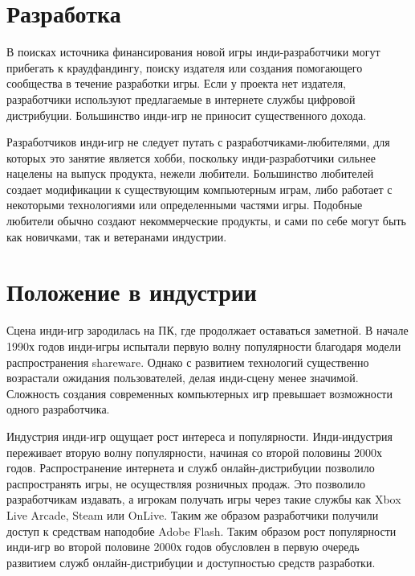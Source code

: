 \section{Разработка}
В поисках источника финансирования новой игры инди-разработчики могут прибегать к краудфандингу, поиску
издателя\cite{2.12,2.22,2.23} или создания помогающего сообщества в течение разработки игры\cite{2.24}. 
Если у проекта нет издателя, разработчики используют предлагаемые в интернете службы цифровой 
дистрибуции. Большинство инди-игр не приносит существенного дохода\cite{2.26}.

Разработчиков инди-игр не следует путать с разработчиками-любителями, для которых это занятие является
хобби, поскольку инди-разработчики сильнее нацелены на выпуск продукта, нежели любители. 
Большинство любителей создает модификации к существующим компьютерным играм, либо работает с 
некоторыми технологиями или определенными частями игры. Подобные любители обычно создают 
некоммерческие продукты, и сами по себе могут быть как новичками, так и ветеранами индустрии.

\section{Положение в индустрии}
Сцена инди-игр зародилась на ПК\cite{2.5}, где продолжает оставаться заметной\cite{2.19}. В начале 1990х 
годов инди-игры испытали первую волну популярности благодаря модели распространения shareware\cite{2.19}. 
Однако с развитием технологий существенно возрастали ожидания пользователей, делая инди-сцену менее 
значимой\cite{2.19}. Сложность создания современных компьютерных игр превышает возможности одного 
разработчика.

Индустрия инди-игр ощущает рост интереса и популярности\cite{2.20}. Инди-индустрия переживает вторую 
волну популярности, начиная со второй половины 2000х годов\cite{2.20}. Распространение интернета и служб
онлайн-дистрибуции позволило распространять игры, не осуществляя розничных продаж. Это позволило
разработчикам издавать\cite{2.5,2.17,2.19,2.20}, а игрокам получать игры через такие службы как
Xbox Live Arcade\cite{2.5}, Steam или OnLive\cite{2.30}. Таким же образом разработчики 
получили доступ к средствам наподобие Adobe Flash\cite{2.20}. Таким образом рост популярности инди-игр во 
второй половине 2000х годов обусловлен в первую очередь развитием служб онлайн-дистрибуции и доступностью 
средств разработки\cite{2.32}.

